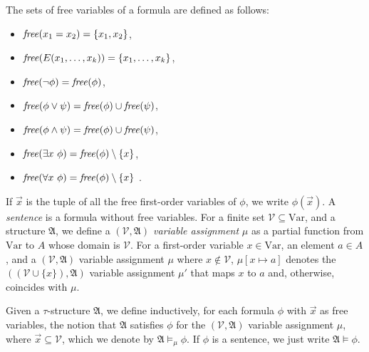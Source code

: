 The sets of free variables of a formula %
 are defined as follows:


\newcommand{\free}{\text{\textit{free}}}

\begin{samepage}
\begin{itemize}
\item $\free(x_1 = x_2) = \{x_1, x_2 \}$,
\item $\free(\relational(x_1,\ldots, x_k)) = \{x_1, \ldots, x_k \}$,
% 
\item $\free(\neg \phi) = \free(\phi)$,
\item $\free(\phi \vee \psi)= \free(\phi) \cup \free(\psi)$,
\item $\free(\phi \wedge \psi)= \free(\phi) \cup  \free(\psi)$,
\item $\free(\exists x ~ \phi) = \free(\phi) \setminus \{ x \}$,
\item $\free(\forall x ~ \phi) = \free(\phi) \setminus \{ x \}$%
.
\end{itemize}
\end{samepage}
If $\overrightarrow{x}$ is the tuple of all the free first-order variables of $\phi$,
we write $\phi(\overrightarrow{x}%
)$. A {\em sentence}
is a formula without free variables.
%
%
For a finite set $\mathcal{V} \subseteq \text{Var} %
$, and a structure $\mathfrak{A}$,
we define a {\em $(\mathcal{V},\mathfrak{A})$ variable assignment} $\mu$ as a partial function from
$\text{Var} %
$ to $A$ whose domain is $\mathcal{V}$. For a first-order variable $x \in \text{Var}$, an element $a \in A$,
and a $(\mathcal{V},\mathfrak{A})$ variable assignment $\mu$ where $x \notin \mathcal{V}$,
 $\mu[x \mapsto a]$ denotes the 
 $((\mathcal{V} \cup \{x\}),\mathfrak{A})$ variable assignment $\mu'$ that maps
 $x$ to $a$ and, otherwise, coincides with $\mu$.



Given a $\tau$-structure $\mathfrak{A}$, we define inductively,
for each formula
$\phi$ with $\overrightarrow{x}%
$ as free variables, the notion that 
$\mathfrak{A}$ satisfies $\phi$ 
for the
 $(\mathcal{V},\mathfrak{A})$ variable assignment $\mu$,
where $\overrightarrow{x}%
 \subseteq \mathcal{V}$,
which we denote by
$\mathfrak{A} \models_\mu \phi$. 
If $\phi$ is a sentence, we just write 
$\mathfrak{A} \models \phi$. 





